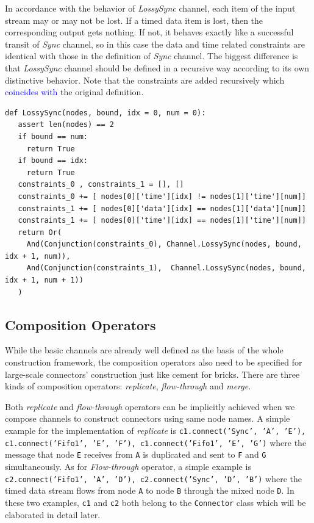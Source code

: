 \documentclass[preprint,3p]{elsarticle}
\newcommand{\liyi}[1]{\textcolor{blue}{#1}}
\begin{document}
In accordance with the behavior of \emph{LossySync} channel, each item of the input stream may or may not be lost. If a timed data item is lost, then the corresponding output gets nothing. If not, it behaves exactly like a successful transit of \emph{Sync} channel, so in this case the data and time related constraints are identical with those in the definition of \emph{Sync} channel. The biggest difference is that \emph{LossySync} channel should be defined in a recursive way according to its own distinctive behavior. Note that the constraints are added recursively which \liyi{coincides with} the original definition.
\begin{lstlisting}
def LossySync(nodes, bound, idx = 0, num = 0):
   assert len(nodes) == 2
   if bound == num:
     return True
   if bound == idx:
     return True
   constraints_0 , constraints_1 = [], []
   constraints_0 += [ nodes[0]['time'][idx] != nodes[1]['time'][num]]
   constraints_1 += [ nodes[0]['data'][idx] == nodes[1]['data'][num]]
   constraints_1 += [ nodes[0]['time'][idx] == nodes[1]['time'][num]]
   return Or(
     And(Conjunction(constraints_0), Channel.LossySync(nodes, bound, idx + 1, num)),
     And(Conjunction(constraints_1),  Channel.LossySync(nodes, bound, idx + 1, num + 1))
   )
\end{lstlisting}
\subsection{Composition Operators}\label{sec:compoperatorZ3}
While the basic channels are already well defined as the basis of the whole construction framework, the composition operators also need to be specified for large-scale connectors' construction just like cement for bricks. There are three kinds of composition operators: \emph{replicate}, \emph{flow-through} and \emph{merge}.

Both \emph{replicate} and \emph{flow-through} operators can be implicitly achieved when we compose channels to construct connectors using same node names. A simple example for the implementation of \emph{replicate} is \texttt{c1.connect('Sync', 'A', 'E'), c1.connect('Fifo1', 'E', 'F'), c1.connect('Fifo1', 'E', 'G')} where the message that node \texttt{E} receives from \texttt{A} is duplicated and sent to \texttt{F} and \texttt{G} simultaneously. As for \emph{Flow-through} operator, a simple example is \texttt{c2.connect('Fifo1', 'A', 'D'), c2.connect('Sync', 'D', 'B')} where the timed data stream flows from node \texttt{A} to node \texttt{B} through the mixed node \texttt{D}. In these two examples, \texttt{c1} and \texttt{c2} both belong to the \texttt{Connector} class which will be elaborated in detail later.
\end{document}
